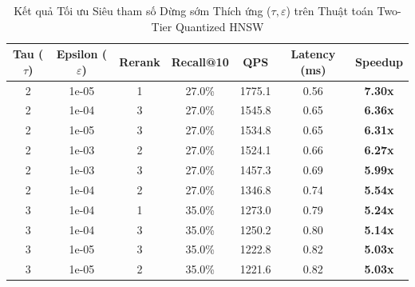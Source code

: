 \begin{table}[H]
\centering
\small
\caption{Kết quả Tối ưu Siêu tham số Dừng sớm Thích ứng ($\tau, \varepsilon$) trên Thuật toán Two-Tier Quantized HNSW}
\label{tab:tuning_early_exit}
\begin{tabular}{ccccccc}
\toprule
\textbf{Tau ($\tau$)} & \textbf{Epsilon ($\varepsilon$)} & \textbf{Rerank} & \textbf{Recall@10} & \textbf{QPS} & \textbf{Latency (ms)} & \textbf{Speedup} \\
\midrule
2 & 1e-05 & 1 & 27.0\% & 1775.1 & 0.56 & \textbf{7.30x} \\
2 & 1e-04 & 3 & 27.0\% & 1545.8 & 0.65 & \textbf{6.36x} \\
2 & 1e-05 & 3 & 27.0\% & 1534.8 & 0.65 & \textbf{6.31x} \\
2 & 1e-03 & 2 & 27.0\% & 1524.1 & 0.66 & \textbf{6.27x} \\
2 & 1e-03 & 3 & 27.0\% & 1457.3 & 0.69 & \textbf{5.99x} \\
2 & 1e-04 & 2 & 27.0\% & 1346.8 & 0.74 & \textbf{5.54x} \\
3 & 1e-04 & 1 & 35.0\% & 1273.0 & 0.79 & \textbf{5.24x} \\
3 & 1e-04 & 3 & 35.0\% & 1250.2 & 0.80 & \textbf{5.14x} \\
3 & 1e-05 & 3 & 35.0\% & 1222.8 & 0.82 & \textbf{5.03x} \\
3 & 1e-05 & 2 & 35.0\% & 1221.6 & 0.82 & \textbf{5.03x} \\
\bottomrule
\end{tabular}
\end{table}
